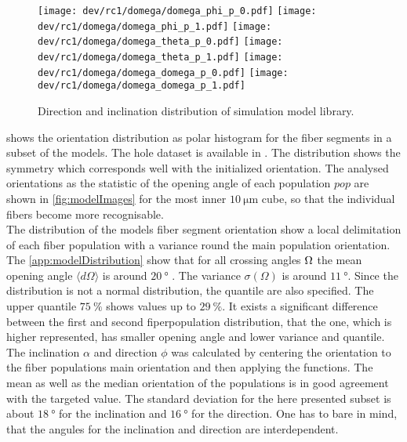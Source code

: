 % 
% 
\begin{figure}[!t]
    \centering
    \texttt{[image: dev/rc1/domega/domega\_phi\_p\_0.pdf]}
    \texttt{[image: dev/rc1/domega/domega\_phi\_p\_1.pdf]}
    \texttt{[image: dev/rc1/domega/domega\_theta\_p\_0.pdf]}
    \texttt{[image: dev/rc1/domega/domega\_theta\_p\_1.pdf]}
    \texttt{[image: dev/rc1/domega/domega\_domega\_p\_0.pdf]}
    \texttt{[image: dev/rc1/domega/domega\_domega\_p\_1.pdf]}
    \caption[Boxplot]{Direction and inclination distribution of simulation model library. }
\end{figure}
% 
% 
% 
 shows the orientation distribution as polar histogram for the fiber segments in a subset of the models. 
The hole dataset is available in .
The distribution shows the symmetry which corresponds well with the initialized orientation.
The analysed orientations as the statistic of the opening angle of each population $pop$ are shown in \cref{fig:modelImages} for the most inner $\SI{10}{\micro\meter}$ cube, so that the individual fibers become more recognisable.
\\
% 
The distribution of the models fiber segment orientation show a local delimitation of each fiber population with a variance round the main population orientation.
The \cref{app:modelDistribution} show that for all crossing angles $\textnormal{$\Omega$}$ the mean opening angle $\langle d\Omega \rangle$ is around $\SI{20}{\degree}$ .
The variance $\sigma(\Omega)$ is around $\SI{11}{\degree}$.
Since the distribution is not a normal distribution, the quantile are also specified.
The upper quantile $\SI{75}{\percent}$ shows values up to $\SI{29}{\percent}$.
It exists a significant difference between the first and second fiperpopulation distribution, that the one, which is higher represented, has smaller opening angle and lower variance and quantile.
\\
The inclination $\alpha$ and direction $\phi$ was calculated by centering the orientation to the fiber populations main orientation and then applying the functions.
The mean as well as the median orientation of the populations is in good agreement with the targeted value.
The standard deviation for the here presented subset is about $\SI{18}{\degree}$ for the inclination and $\SI{16}{\degree}$  for the direction. 
One has to bare in mind, that the angules for the inclination and direction are interdependent.
